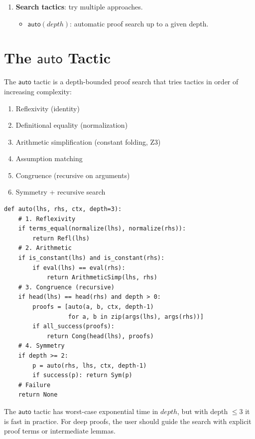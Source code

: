 \begin{enumerate}
\item \textbf{Search tactics}: try multiple approaches.
  \begin{itemize}
  \item $\mathsf{auto}(\mathit{depth})$: automatic proof search up to a
    given depth.
  \end{itemize}
\end{enumerate}


\section{The \texorpdfstring{$\mathsf{auto}$}{auto} Tactic}

The $\mathsf{auto}$ tactic is a depth-bounded proof search that tries
tactics in order of increasing complexity:

\begin{enumerate}
\item Reflexivity (identity)
\item Definitional equality (normalization)
\item Arithmetic simplification (constant folding, Z3)
\item Assumption matching
\item Congruence (recursive on arguments)
\item Symmetry + recursive search
\end{enumerate}

\begin{lstlisting}
def auto(lhs, rhs, ctx, depth=3):
    # 1. Reflexivity
    if terms_equal(normalize(lhs), normalize(rhs)):
        return Refl(lhs)
    # 2. Arithmetic
    if is_constant(lhs) and is_constant(rhs):
        if eval(lhs) == eval(rhs):
            return ArithmeticSimp(lhs, rhs)
    # 3. Congruence (recursive)
    if head(lhs) == head(rhs) and depth > 0:
        proofs = [auto(a, b, ctx, depth-1)
                  for a, b in zip(args(lhs), args(rhs))]
        if all_success(proofs):
            return Cong(head(lhs), proofs)
    # 4. Symmetry
    if depth >= 2:
        p = auto(rhs, lhs, ctx, depth-1)
        if success(p): return Sym(p)
    # Failure
    return None
\end{lstlisting}

\begin{remark}
The $\mathsf{auto}$ tactic has worst-case exponential time in
$\mathit{depth}$, but with depth $\leq 3$ it is fast in practice.
For deep proofs, the user should guide the search with explicit
proof terms or intermediate lemmas.
\end{remark}


